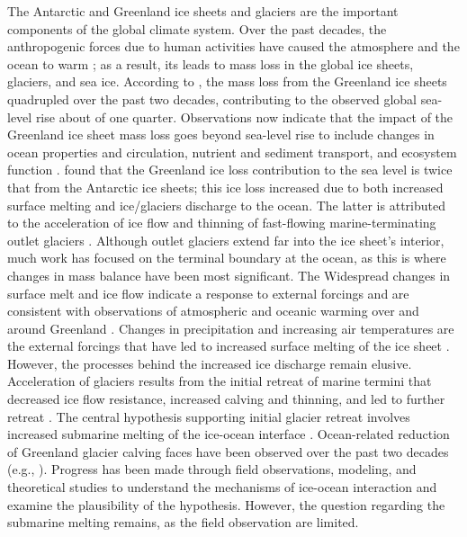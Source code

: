 \documentclass[11pt,a4paper]{article}
\begin{document}
	The Antarctic and Greenland ice sheets and glaciers are the important components of the global climate system. Over the past decades, the anthropogenic forces due to human activities have caused the atmosphere and the ocean to warm \citep{noble2020sensitivity}; as a result, its leads to mass loss in the global ice sheets, glaciers, and sea ice. According to \cite{straneo2013north}, the mass loss from the Greenland ice sheets quadrupled over the past two decades, contributing to the observed global sea-level rise about of one quarter. Observations now indicate that the impact of the Greenland ice sheet mass loss goes beyond sea-level rise to include changes in ocean properties and circulation, nutrient and sediment transport, and ecosystem function \citep{catania2020future}. \cite{straneo2013north} found that the Greenland ice loss contribution to the sea level is twice that from the Antarctic ice sheets; this ice loss increased due to both increased surface melting and ice/glaciers discharge to the ocean. %
	The latter is attributed to the acceleration of ice flow and thinning of fast-flowing marine-terminating outlet glaciers \citep{nick2013future}. Although outlet glaciers extend far into the ice sheet's interior, much work has focused on the terminal boundary at the ocean, as this is where changes in mass balance have been most significant. The Widespread changes in surface melt and ice flow indicate a response to external forcings and are consistent with observations of atmospheric and oceanic warming over and around Greenland \citep{bersch2007recent,box2009greenland,straneo2013north}. Changes in precipitation and increasing air temperatures are the external forcings that have led to increased surface melting of the ice sheet \citep{van2009partitioning,straneo2013north}. However, the processes behind the increased ice discharge remain elusive. %
	Acceleration of glaciers results from the initial retreat of marine termini that decreased ice flow resistance, increased calving and thinning, and led to further retreat \citep{nick2009large,straneo2013challenges}. The central hypothesis supporting initial glacier retreat involves increased submarine melting of the ice-ocean interface \citep{straneo2013challenges}. Ocean-related reduction of Greenland glacier calving faces have been observed over the past two decades (e.g., \cite{rignot2010rapid,straneo2015dynamics,schaffer2017warm}). Progress has been made through field observations, modeling, and theoretical studies to understand the mechanisms of ice-ocean interaction and examine the plausibility of the hypothesis. However, the question regarding the submarine melting remains, as the field observation are limited.
	
\end{document}
